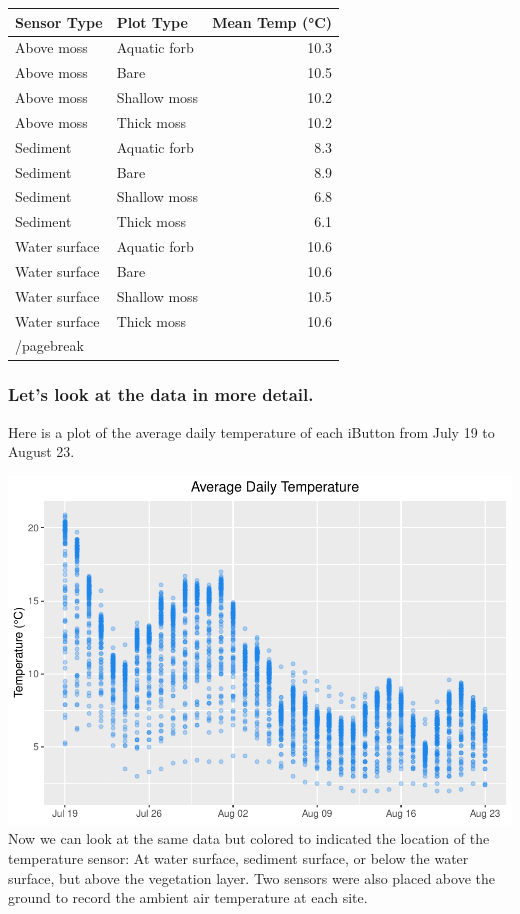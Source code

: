 \documentclass[
]{article}
\begin{document}
\begin{longtable}[]{@{}llr@{}}
\toprule
Sensor Type & Plot Type & Mean Temp (°C) \\
\midrule
\endhead
Above moss & Aquatic forb & 10.3 \\
Above moss & Bare & 10.5 \\
Above moss & Shallow moss & 10.2 \\
Above moss & Thick moss & 10.2 \\
Sediment & Aquatic forb & 8.3 \\
Sediment & Bare & 8.9 \\
Sediment & Shallow moss & 6.8 \\
Sediment & Thick moss & 6.1 \\
Water surface & Aquatic forb & 10.6 \\
Water surface & Bare & 10.6 \\
Water surface & Shallow moss & 10.5 \\
Water surface & Thick moss & 10.6 \\
/pagebreak & & \\
\bottomrule
\end{longtable}

\hypertarget{lets-look-at-the-data-in-more-detail.}{%
\subsubsection{Let's look at the data in more
detail.}\label{lets-look-at-the-data-in-more-detail.}}

Here is a plot of the average daily temperature of each iButton from
July 19 to August 23.

\includegraphics{iButtons2022-2-17_files/figure-latex/unnamed-chunk-16-1.pdf}
Now we can look at the same data but colored to indicated the location
of the temperature sensor: At water surface, sediment surface, or below
the water surface, but above the vegetation layer. Two sensors were also
placed above the ground to record the ambient air temperature at each
site.
\end{document}
